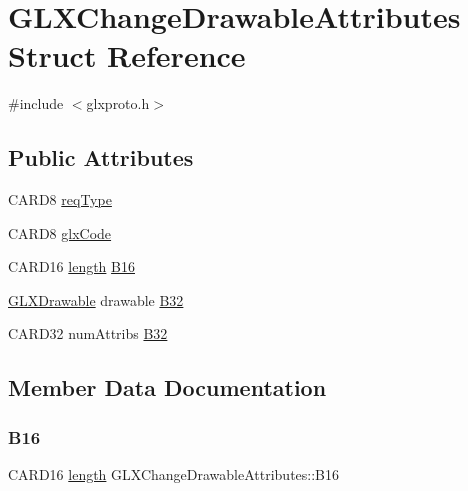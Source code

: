 \hypertarget{struct_g_l_x_change_drawable_attributes}{}\section{G\+L\+X\+Change\+Drawable\+Attributes Struct Reference}
\label{struct_g_l_x_change_drawable_attributes}


{\ttfamily \#include $<$glxproto.\+h$>$}

\subsection*{Public Attributes}
\begin{DoxyCompactItemize}
\item 
C\+A\+R\+D8 \hyperlink{struct_g_l_x_change_drawable_attributes_a079fe918ddbea6f99fbf6fb343f646e6}{req\+Type}
\item 
C\+A\+R\+D8 \hyperlink{struct_g_l_x_change_drawable_attributes_a36e8cc87e3d8df8459b1dfddf5bd38b2}{glx\+Code}
\item 
C\+A\+R\+D16 \hyperlink{glcorearb_8h_ab9c919755bde3b34349e23a32b4e0fa7}{length} \hyperlink{struct_g_l_x_change_drawable_attributes_a95acc587dfdc6dcdbc2cef30751105a3}{B16}
\item 
\hyperlink{glx_8h_a826f51745d9d6c81bdbac47ae2b80cf7}{G\+L\+X\+Drawable} drawable \hyperlink{struct_g_l_x_change_drawable_attributes_a21e5a55b227329bab3f394a409c10fb4}{B32}
\item 
C\+A\+R\+D32 num\+Attribs \hyperlink{struct_g_l_x_change_drawable_attributes_aeee0b03beafe1ebd0c55e7b092760964}{B32}
\end{DoxyCompactItemize}


\subsection{Member Data Documentation}
\mbox{\label{struct_g_l_x_change_drawable_attributes_a95acc587dfdc6dcdbc2cef30751105a3}} 
\subsubsection{\texorpdfstring{B16}{B16}}
{\footnotesize\ttfamily C\+A\+R\+D16 \hyperlink{glcorearb_8h_ab9c919755bde3b34349e23a32b4e0fa7}{length} G\+L\+X\+Change\+Drawable\+Attributes\+::\+B16}

